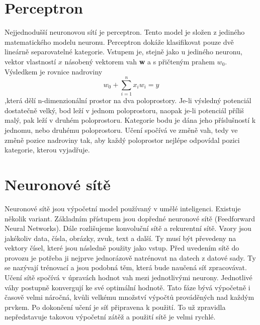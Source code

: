 \section{Perceptron}
Nejjednodušší neuronovou sítí je perceptron.
Tento model je složen z jediného matematického modelu neuronu.
Perceptron dokáže klasifikovat pouze dvě lineárně separovatelné kategorie.
Vstupem je, stejně jako u jediného neuronu, vektor vlastností $x$
násobený vektorem vah \textbf{w} a s přičteným prahem $ w_0 $.
Výsledkem je rovnice nadroviny
\begin{equation}
    w_0 + \sum_{i=1}^{n} x_{i}w_{i} = y
\end{equation}
,která dělí n-dimenzionální prostor na dva poloprostory.
Je-li výsledný potenciál dostatečně velký, bod leží v jednom poloprostoru,
naopak je-li potenciál příliš malý, pak leží v druhém poloprostoru.
Kategorie bodu je dána jeho příslušností k jednomu, nebo druhému poloprostoru.
Učení spočívá ve změně vah, tedy ve změně pozice nadroviny tak,
aby každý poloprostor nejlépe odpovídal pozici kategorie, 
kterou vyjadřuje. 

\section{Neuronové sítě}
Neuronové sítě jsou výpočetní model používaný v umělé inteligenci.
Existuje několik variant.
Základním přístupem jsou dopředné neuronové sítě (Feedforward Neural Networks).
Dále rozlišujeme konvoluční sítě\cite{krizhevsky2012imagenet} 
a rekurentní sítě\cite{Karpathy_RNNs}.
Vzory jsou jakékoliv data, čísla, obrázky, zvuk, text a další.
Ty musí být převedeny na vektory čísel, 
které jsou následně použity jako vstup.
Před uvedením sítě do provozu je potřeba 
ji nejprve jednorázově natrénovat na datech z datové sady.
Ty se nazývají trénovací a jsou podobná těm, 
která bude naučená síť zpracovávat.
Učení sítě spočívá v úpravách hodnot vah mezi jednotlivými neurony.
Jednotlivé váhy postupně konvergují ke své optimální hodnotě.
Tato fáze bývá výpočetně i časově velmi náročná,
kvůli velkému množství výpočtů prováděných nad každým prvkem. 
Po dokončení učení je síť připravena k použití.
To už zpravidla nepředstavuje takovou výpočetní zátěž
a použití sítě je velmi rychlé.
\par

